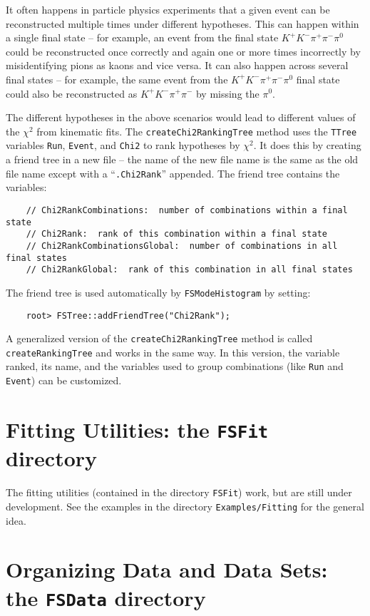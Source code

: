 \documentclass[11pt]{article}
\begin{document}
It often happens in particle physics experiments that a given event can be reconstructed multiple times under different hypotheses.  This can happen within a single final state -- for example, an event from the final state $K^+K^-\pi^+\pi^-\pi^0$ could be reconstructed once correctly and again one or more times incorrectly by misidentifying pions as kaons and vice versa.  It can also happen across several final states -- for example, the same event from the $K^+K^-\pi^+\pi^-\pi^0$ final state could also be reconstructed as $K^+K^-\pi^+\pi^-$ by missing the $\pi^0$.  

The different hypotheses in the above scenarios would lead to different values of the $\chi^2$ from kinematic fits.  The {\tt createChi2RankingTree} method uses the {\tt TTree} variables {\tt Run}, {\tt Event}, and {\tt Chi2} to rank hypotheses by $\chi^2$.  It does this by creating a friend tree in a new file -- the name of the new file name is the same as the old file name except with a ``{\tt .Chi2Rank}'' appended.  The friend tree contains the variables:
\begin{verbatim}
    // Chi2RankCombinations:  number of combinations within a final state
    // Chi2Rank:  rank of this combination within a final state
    // Chi2RankCombinationsGlobal:  number of combinations in all final states
    // Chi2RankGlobal:  rank of this combination in all final states
\end{verbatim}
The friend tree is used automatically by {\tt FSModeHistogram} by setting:
\begin{verbatim}
    root> FSTree::addFriendTree("Chi2Rank");
\end{verbatim}
A generalized version of the {\tt createChi2RankingTree} method is called {\tt createRankingTree} and works in the same way.  In this version, the variable ranked, its name, and the variables used to group combinations (like {\tt Run} and {\tt Event}) can be customized.


\section{Fitting Utilities:  the {\tt FSFit} directory}

The fitting utilities (contained in the directory {\tt FSFit}) work, but are still under development.  See the examples in the directory {\tt Examples/Fitting} for the general idea.

\section{Organizing Data and Data Sets: the {\tt FSData} directory}
\end{document}
